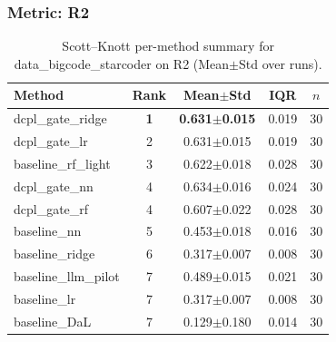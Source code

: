 \subsubsection*{Metric: R2}
\begin{table}[H]
\centering
\scriptsize
\setlength{\tabcolsep}{4pt}
\renewcommand{\arraystretch}{1.1}
\caption{Scott--Knott per-method summary for data\_bigcode\_starcoder on R2 (Mean$\pm$Std over runs).}
\label{tab:sk_data_bigcode_starcoder_R2}
\begin{tabular}{l|c|c|c|c}
\hline
\textbf{Method} & \textbf{Rank} & \textbf{Mean$\pm$Std} & \textbf{IQR} & \textbf{$n$} \\
\hline
\rowcolor{red!15} dcpl\_gate\_ridge & \textbf{1} & \textbf{0.631$\pm$0.015} & 0.019 & 30 \\
dcpl\_gate\_lr & 2 & 0.631$\pm$0.015 & 0.019 & 30 \\
baseline\_rf\_light & 3 & 0.622$\pm$0.018 & 0.028 & 30 \\
dcpl\_gate\_nn & 4 & 0.634$\pm$0.016 & 0.024 & 30 \\
dcpl\_gate\_rf & 4 & 0.607$\pm$0.022 & 0.028 & 30 \\
baseline\_nn & 5 & 0.453$\pm$0.018 & 0.016 & 30 \\
baseline\_ridge & 6 & 0.317$\pm$0.007 & 0.008 & 30 \\
baseline\_llm\_pilot & 7 & 0.489$\pm$0.015 & 0.021 & 30 \\
baseline\_lr & 7 & 0.317$\pm$0.007 & 0.008 & 30 \\
baseline\_DaL & 7 & 0.129$\pm$0.180 & 0.014 & 30 \\
\hline
\end{tabular}
\end{table}

